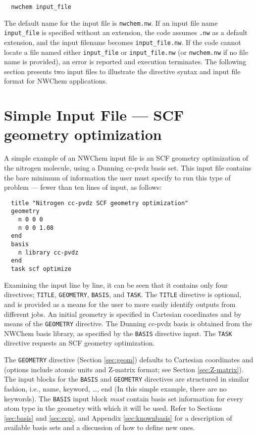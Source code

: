 \begin{verbatim}
  nwchem input_file
\end{verbatim}

The default name for the input file is \verb+nwchem.nw+.  If an input
file name \verb+input_file+ is specified without an extension, the
code assumes \verb+.nw+ as a default extension, and the input filename
becomes \verb+input_file.nw+.  If the code cannot locate a file named
either \verb+input_file+ or \verb+input_file.nw+ (or \verb+nwchem.nw+
if no file name is provided), an error is reported and execution
terminates.  The following section presents two input files to
illustrate the directive syntax and input file format for NWChem
applications.

\section{Simple Input File --- SCF geometry optimization}
\label{sec:simplesample}

A simple example of an NWChem input file is an SCF geometry optimization of
the nitrogen molecule, using a Dunning cc-pvdz basis set.  This input
file contains the bare minimum of information the user must specify
to run this type of problem --- fewer than ten lines of input,
as follows:
\begin{verbatim}
  title "Nitrogen cc-pvdz SCF geometry optimization"
  geometry  
    n 0 0 0
    n 0 0 1.08
  end
  basis
    n library cc-pvdz
  end
  task scf optimize
\end{verbatim}

Examining the input line by line, it can be seen that it contains
only four directives; \verb+TITLE+, \verb+GEOMETRY+, \verb+BASIS+, and
\verb+TASK+.  The \verb+TITLE+ directive is optional, and is provided
as a means for the user to more easily identify outputs from different
jobs.  An initial geometry is specified in Cartesian coordinates and
{\angstroms} by means of the \verb+GEOMETRY+ directive.  The Dunning 
cc-pvdz basis is obtained from the NWChem basis library, as specified
by the \verb+BASIS+ directive input.  The \verb+TASK+ directive requests 
an SCF geometry optimization.

The \verb+GEOMETRY+ directive (Section \ref{sec:geom}) defaults to Cartesian
coordinates and {\angstroms} (options include atomic units and
Z-matrix format; see Section \ref{sec:Z-matrix}).  The input blocks for the  \verb+BASIS+ 
and \verb+GEOMETRY+ directives are structured in similar fashion, 
i.e., name, keyword, \ldots, end (In this simple example, there are no keywords).  The \verb+BASIS+ input block {\em must} contain basis set information for
every atom type in the geometry with which it will be used.
Refer to Sections \ref{sec:basis} and \ref{sec:ecp}, and Appendix
\ref{sec:knownbasis} for a description of available basis sets and a
discussion of how to define new ones.

